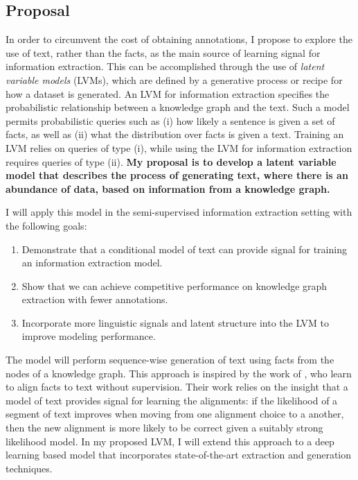 \documentclass[12pt]{article}
\begin{document}
\subsection*{Proposal}
In order to circumvent the cost of obtaining annotations, I propose to explore the use of text, rather than the facts, as the main source of learning signal for information extraction. This can be accomplished through the use of \textit{latent variable models} (LVMs), which are defined
by a generative process or recipe for how a dataset is generated.
An LVM for information extraction specifies the probabilistic relationship between a knowledge graph and the text. Such a model permits probabilistic queries such as (i) how likely a sentence is given a set of facts, as well as (ii) what the distribution over facts is given a text. Training an LVM relies on queries of type (i), while using the LVM for information extraction requires queries of type (ii). \textbf{My proposal is to develop a latent variable model that describes the process of generating text, where there is an abundance of data, based on information from a knowledge graph.} 

I will apply this model in the
semi-supervised information extraction setting
with the following goals:
\begin{enumerate}
\item Demonstrate that a conditional model of text can provide signal for training an information extraction model.
\item Show that we can achieve competitive performance on knowledge graph extraction with fewer annotations. 
\item Incorporate more linguistic signals and latent structure into the LVM to improve modeling performance.
\end{enumerate}
The model will perform sequence-wise generation of text using facts from the nodes of a knowledge graph.
This approach is inspired by the work of \citet{liang2009semalign}, who learn to align facts to text without supervision.
Their work relies on the insight that a model of text
provides signal for learning the alignments:
if the likelihood of a segment of text improves when moving from one alignment choice to a another,
then the new alignment is more likely to be correct given a suitably strong likelihood model. In my proposed LVM, I will extend this approach to a deep learning based model that incorporates state-of-the-art extraction and generation techniques.
\end{document}
